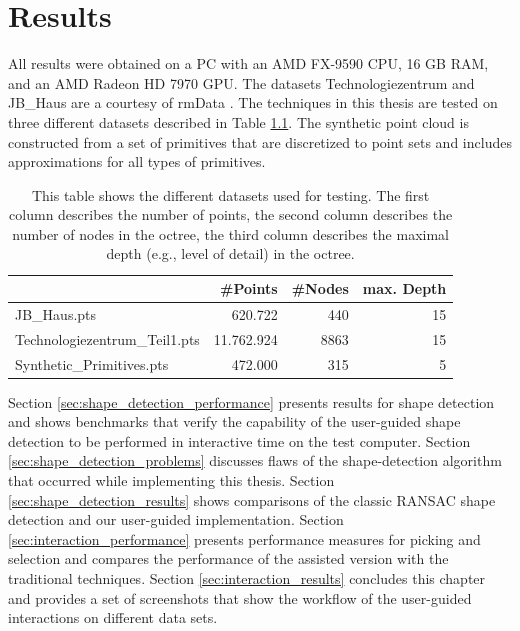 \chapter{Results}
\label{chap:results}

All results were obtained on a PC with an AMD FX-9590 CPU, 16 GB RAM, and an AMD Radeon HD 7970 GPU. The datasets Technologiezentrum and JB\_Haus are a courtesy of rmData \cite{rmdata}. The techniques in this thesis are tested on three different datasets described in Table \ref{tab:datasets}. The synthetic point cloud is constructed from a set of primitives that are discretized to point sets and includes approximations for all types of primitives. 

\begin{table}
\centering
\begin{tabular}{ l | r | r | r }
                        & \textbf{\#Points} & \textbf{\#Nodes}    & \textbf{max. Depth} \\
    \hline
  JB\_Haus.pts                  & 620.722           & 440   & 15 \\
  Technologiezentrum\_Teil1.pts    & 11.762.924        & 8863  & 15 \\
  Synthetic\_Primitives.pts     & 472.000           & 315   & 5 \\
\end{tabular}
\caption[Table of point-cloud datasets]
{This table shows the different datasets used for testing. The first column describes the number of points, the second column describes the number of nodes in the octree, the third column describes the maximal depth (e.g., level of detail) in the octree. } 
\label{tab:datasets}
\end{table}


Section \ref{sec:shape_detection_performance} presents results for shape detection and shows benchmarks that verify the capability of the user-guided shape detection to be performed in interactive time on the test computer.
Section \ref{sec:shape_detection_problems} discusses flaws of the shape-detection algorithm that occurred while implementing this thesis.
Section \ref{sec:shape_detection_results} shows comparisons of the classic RANSAC shape detection and our user-guided implementation. 
Section \ref{sec:interaction_performance} presents performance measures for picking and selection and compares the performance of the assisted version with the traditional techniques. 
Section \ref{sec:interaction_results} concludes this chapter and provides a set of screenshots that show the workflow of the user-guided interactions on different data sets. 


